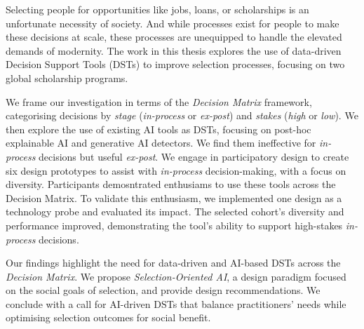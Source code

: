 Selecting people for opportunities like jobs, loans, or scholarships is an unfortunate necessity of society. And while processes exist for people to make these decisions at scale, these processes are unequipped to handle the elevated demands of modernity. The work in this thesis explores the use of data-driven Decision Support Tools (DSTs) to improve selection processes, focusing on two global scholarship programs.

We frame our investigation in terms of the \emph{Decision Matrix} framework, categorising decisions by \emph{stage} (\emph{in-process} or \emph{ex-post}) and \emph{stakes} (\emph{high} or \emph{low}). We then explore the use of existing AI tools as DSTs, focusing on post-hoc explainable AI and generative AI detectors. We find them ineffective for \emph{in-process} decisions but useful \emph{ex-post}. We engage in participatory design to create six design prototypes to assist with \emph{in-process} decision-making, with a focus on diversity. Participants demosntrated enthusiams to use these tools across the Decision Matrix. To validate this enthusiasm, we implemented one design as a technology probe and evaluated its impact. The selected cohort's diversity and performance improved, demonstrating the tool's ability to support high-stakes \emph{in-process} decisions. 

Our findings highlight the need for data-driven and AI-based DSTs across the \emph{Decision Matrix}. We propose \emph{Selection-Oriented AI}, a design paradigm focused on the social goals of selection, and provide design recommendations. We conclude with a call for AI-driven DSTs that balance practitioners' needs while optimising selection outcomes for social benefit.